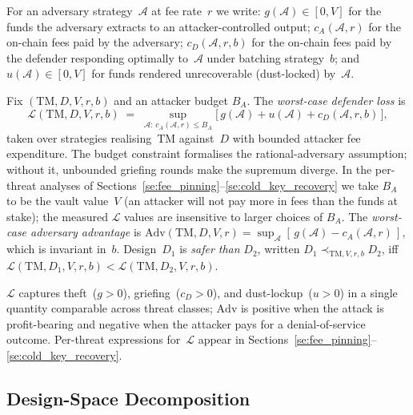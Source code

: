 \begin{definition} \label{def:strategy_costs}
For an adversary strategy~$\mathcal{A}$ at fee rate~$r$ we write:
$g(\mathcal{A}) \in [0, V]$ for the funds the adversary extracts to an
attacker-controlled output; $c_A(\mathcal{A}, r)$ for the on-chain fees
paid by the adversary; $c_D(\mathcal{A}, r, b)$ for the on-chain fees
paid by the defender responding optimally to~$\mathcal{A}$ under
batching strategy~$b$; and $u(\mathcal{A}) \in [0, V]$ for funds
rendered unrecoverable (dust-locked) by~$\mathcal{A}$.
\end{definition}

\begin{definition} \label{def:loss_adv}
Fix $(\mathrm{TM}, D, V, r, b)$ and an attacker budget $B_A$. The
\emph{worst-case defender loss} is
\[
  \mathcal{L}(\mathrm{TM}, D, V, r, b)
  \;=\; \sup_{\mathcal{A}:\, c_A(\mathcal{A}, r) \leq B_A}
    \bigl[\, g(\mathcal{A}) + u(\mathcal{A}) + c_D(\mathcal{A}, r, b) \,\bigr],
\]
taken over strategies realising~$\mathrm{TM}$ against~$D$ with
bounded attacker fee expenditure. The budget constraint formalises
the rational-adversary assumption; without it, unbounded griefing
rounds make the supremum diverge. In the per-threat analyses of
Sections~\ref{se:fee_pinning}--\ref{se:cold_key_recovery} we take
$B_A$ to be the vault value~$V$ (an attacker will not pay more in
fees than the funds at stake); the measured $\mathcal{L}$ values
are insensitive to larger choices of $B_A$.
The \emph{worst-case adversary advantage} is
$\mathrm{Adv}(\mathrm{TM}, D, V, r) =
\sup_{\mathcal{A}}[\, g(\mathcal{A}) - c_A(\mathcal{A}, r) \,]$,
which is invariant in~$b$. Design~$D_1$ is \emph{safer than} $D_2$,
written $D_1 \prec_{\mathrm{TM}, V, r, b} D_2$, iff
$\mathcal{L}(\mathrm{TM}, D_1, V, r, b) <
\mathcal{L}(\mathrm{TM}, D_2, V, r, b)$.
\end{definition}

$\mathcal{L}$ captures theft~($g > 0$), griefing~($c_D > 0$), and
dust-lockup~($u > 0$) in a single quantity comparable across threat
classes; $\mathrm{Adv}$ is positive when the attack is profit-bearing
and negative when the attacker pays for a denial-of-service outcome.
Per-threat expressions for~$\mathcal{L}$ appear in
Sections~\ref{se:fee_pinning}--\ref{se:cold_key_recovery}.

\subsection{Design-Space Decomposition}
\label{ss:design_space}


